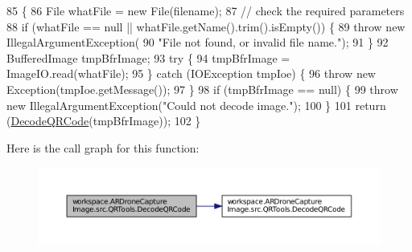 \begin{DoxyCode}
85                                                                         \{
86         File whatFile = \textcolor{keyword}{new} File(filename);
87         \textcolor{comment}{// check the required parameters}
88         \textcolor{keywordflow}{if} (whatFile == null || whatFile.getName().trim().isEmpty()) \{
89             \textcolor{keywordflow}{throw} \textcolor{keyword}{new} IllegalArgumentException(
90                     \textcolor{stringliteral}{"File not found, or invalid file name."});
91         \}
92         BufferedImage tmpBfrImage;
93         \textcolor{keywordflow}{try} \{
94             tmpBfrImage = ImageIO.read(whatFile);
95         \} \textcolor{keywordflow}{catch} (IOException tmpIoe) \{
96             \textcolor{keywordflow}{throw} \textcolor{keyword}{new} Exception(tmpIoe.getMessage());
97         \}
98         \textcolor{keywordflow}{if} (tmpBfrImage == null) \{
99             \textcolor{keywordflow}{throw} \textcolor{keyword}{new} IllegalArgumentException(\textcolor{stringliteral}{"Could not decode image."});
100         \}
101         \textcolor{keywordflow}{return} (\hyperlink{classworkspace_1_1_a_r_drone_capture_image_1_1src_1_1_q_r_tools_a0be4c483192776f45ff0fae15c54a870}{DecodeQRCode}(tmpBfrImage));
102     \}
\end{DoxyCode}


Here is the call graph for this function\+:\nopagebreak
\begin{figure}[H]
\begin{center}
\leavevmode
\includegraphics[width=350pt]{classworkspace_1_1_a_r_drone_capture_image_1_1src_1_1_q_r_tools_a2a0657098c3e0105d1512ed949e22e6a_cgraph}
\end{center}
\end{figure}


\hypertarget{classworkspace_1_1_a_r_drone_capture_image_1_1src_1_1_q_r_tools_a423b4e5f2340e6c677b83bf43722d726}{}
